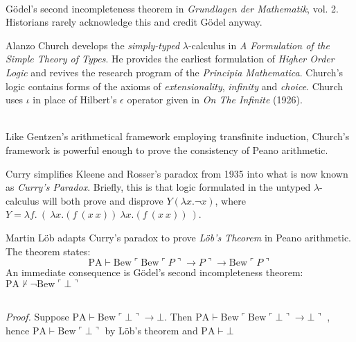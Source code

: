 \documentclass{beamer}
\begin{document}
\begin{frame}[allowframebreaks]{\insertsectionhead\ \textemdash\
    \insertsubsectionhead}
\begin{description}
    G\"odel's second incompleteness theorem in \emph{Grundlagen der
      Mathematik}, vol. 2.  Historians rarely acknowledge this and
    credit G\"odel anyway.
  \item[1940] Alanzo Church develops the \emph{simply-typed}
    $\lambda$-calculus in \emph{A Formulation of the Simple Theory of
      Types}.  He provides the earliest formulation of \emph{Higher
      Order Logic} and revives the research program of the
    \emph{Principia Mathematica}.  Church's logic contains forms of
    the axioms of \emph{extensionality}, \emph{infinity} and
    \emph{choice}.  Church uses $\iota$ in place of Hilbert's
    $\epsilon$ operator given in \emph{On The Infinite} (1926).\\~\

    Like Gentzen's arithmetical framework employing transfinite
    induction, Church's framework is powerful enough to prove the
    consistency of Peano arithmetic.
  \item[1942] Curry simplifies Kleene and Rosser's paradox from 1935
    into what is now known as \emph{Curry's Paradox}.  Briefly, this
    is that logic formulated in the untyped $\lambda$-calculus will
    both prove and disprove $Y (\lambda x. \neg x)$, where
    $Y = \lambda f. \ (\ \lambda x.(f\ (x\ x))\ \lambda x.(f\ (x\ x))
    \ )$.
  \item[1955] Martin L\"ob adapts Curry's paradox to prove
    \emph{L\"ob's Theorem} in Peano arithmetic.  The theorem states:
    \[
      \mathrm{PA} \vdash \mathrm{Bew} \ulcorner \mathrm{Bew} \ulcorner
      P \urcorner \to P \urcorner \to \mathrm{Bew} \ulcorner P
      \urcorner
    \]
    An immediate consequence is G\"odel's second incompleteness
    theorem:
    \(\mathrm{PA} \nvdash \neg \mathrm{Bew} \ulcorner \bot \urcorner
    \)\\~\

    \emph{Proof.} Suppose
    \(\mathrm{PA} \vdash \mathrm{Bew} \ulcorner \bot \urcorner \to
    \bot\).  Then
    \(\mathrm{PA} \vdash \mathrm{Bew} \ulcorner \mathrm{Bew} \ulcorner
    \bot \urcorner \to \bot\urcorner \) , hence
    \(\mathrm{PA} \vdash \mathrm{Bew} \ulcorner \bot \urcorner \) by
    L\"ob's theorem and \(\mathrm{PA} \vdash \bot\) \Lightning
  \end{description}
\end{frame}
\end{document}
